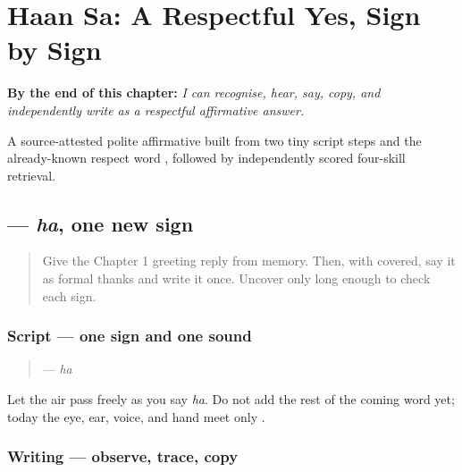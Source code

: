 
\chapter{Haan Sa: A Respectful Yes, Sign by Sign}
\label{ch:mw-haan-saa}

\begin{chapteropening}
\textbf{By the end of this chapter:} \emph{I can recognise, hear, say, copy, and independently write   as a respectful affirmative answer.}

A source-attested polite affirmative built from two tiny script steps and the already-known respect word , followed by independently scored four-skill retrieval.
\end{chapteropening}

\section[\texorpdfstring{\mw{ह} (ha)}{ह (ha)}]{ — \emph{ha}, one new sign}

\label{lesson:MW-W03-ha}



\begin{quote}
Give the Chapter 1 greeting reply from memory. Then, with \textbf{} covered, say it as formal thanks and write it once. Uncover only long enough to check each sign.
\end{quote}

\subsection*{Script — one sign and one sound}
\begin{quote}
\textbf{} — \emph{ha}
\end{quote}

Let the air pass freely as you say \emph{ha}. Do not add the rest of the coming word yet; today the eye, ear, voice, and hand meet only \textbf{}.

\subsection*{Writing — observe, trace, copy}


